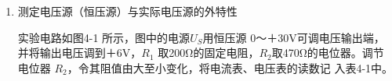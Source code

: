 \documentclass[UTF8]{article}
\begin{document}
            \begin{enumerate}[label=\textbf{\arabic*}.]
                \item 测定电压源（恒压源）与实际电压源的外特性
                \begin{adjustwidth}{0em}{0em}
                    \begin{minipage}{0.5\textwidth}
                        \raggedright
                        \noindent\hspace{2em}实验电路如图4-1 所示，图中的电源$U_S$用恒压源
                        0～＋30V可调电压输出端，并将输出电压调到＋6V，$R_1$
                        取200Ω的固定电阻，$R_2$取470Ω的电位器。调节电位器
                       $R_2$，令其阻值由大至小变化，将电流表、电压表的读数记
                        入表4-1中。 
                    \end{minipage}
                    \begin{minipage}{0.5\textwidth}
                        

\end{minipage}
\end{adjustwidth}
\end{enumerate}
\end{document}
